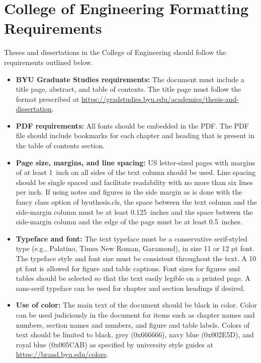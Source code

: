 \chapter{College of Engineering Formatting Requirements}
\label{ap:format}

Theses and dissertations in the College of Engineering should follow the requirements outlined below.

\begin{itemize}
 \item {\bfseries BYU Graduate Studies requirements:}  The document must include a title page, abstract, and table of contents. The title page must follow the format prescribed at \url{https://gradstudies.byu.edu/academics/thesis-and-dissertation}.  

\item {\bfseries PDF requirements:} All fonts should be embedded in the PDF. The PDF file should include bookmarks for each chapter and heading that is present in the table of contents section.

\item {\bfseries Page size, margins, and line spacing:} US letter-sized pages with margins of at least 1~inch on all sides of the text column should be used. Line spacing should be single spaced and facilitate readability with no more than six lines per inch. If using notes and figures in the side margin as is done with the {\ttfamily fancy} class option of {\ttfamily byuthesis.cls}, the space between the text column and the side-margin column must be at least 0.125~inches and the space between the side-margin column and the edge of the page must be at least 0.5~inches. 

\item {\bfseries Typeface and font:} The text typeface must be a conservative serif-styled type (e.g., Palatino, Times New Roman, Garamond), in size 11 or 12 pt font. The typeface style and font size must be consistent throughout the text. A 10 pt font is allowed for figure and table captions. Font sizes for figures and tables should be selected so that the text easily legible on a printed page. A sans-serif typeface can be used for chapter and section headings if desired.

\item {\bfseries Use of color:} The main text of the document should be black in color. Color can be used judiciously in the document for items such as chapter names and numbers, section names and numbers, and figure and table labels. Colors of text should be limited to black, grey ({\ttfamily 0x666666}), navy blue ({\ttfamily 0x002E5D}), and royal blue ({\ttfamily 0x005CAB}) as specified by university style guides at \url{https://brand.byu.edu/colors}.


\end{itemize}
